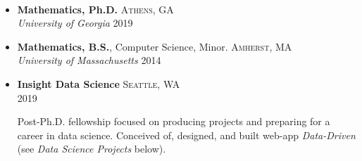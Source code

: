 \documentclass[10pt]{article}
\begin{document}
\vspace{-0.4in}
\tabto{18.9cm}
{   
\\



  
\spacedhrule{0.5em}{-.04em}


\begin{itemize}
  \item \textbf{Mathematics, Ph.D.} \hfill \textsc{Athens, GA} \\
        \emph{University of Georgia} \hfill \textsc{2019}
  \item {\textbf{Mathematics, B.S.}, Computer Science, Minor. } \hfill \textsc{Amherst, MA} \\
  \emph{University of Massachusetts} \hfill \textsc{2014}
\end{itemize}

\spacedhrule{0.5em}{-0.4em}


\begin{itemize}
  \item \textbf{Insight Data Science} \hfill \textsc{Seattle, WA} \\
        \null \hfill \textsc{2019}

        \vspace{-1em}
  \parbox[H]{15cm}{ 
        Post-Ph.D. fellowship focused on producing projects and preparing for a career in data science. Conceived of, designed, and built web-app \emph{Data-Driven} (see \emph{Data Science Projects} below).
        }
\end{itemize}

\spacedhrule{0.5em}{-0.4em}

}
\end{document}
